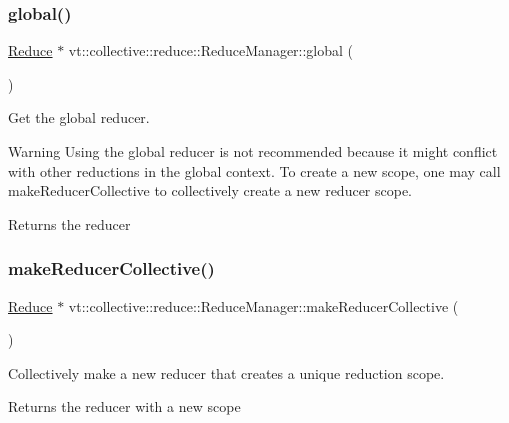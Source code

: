 \subsubsection{\texorpdfstring{global()}{global()}}
{\footnotesize\ttfamily \hyperlink{structvt_1_1collective_1_1reduce_1_1_reduce}{Reduce} $\ast$ vt\+::collective\+::reduce\+::\+Reduce\+Manager\+::global (\begin{DoxyParamCaption}{ }\end{DoxyParamCaption})}



Get the global reducer. 

\begin{DoxyWarning}{Warning}
Using the global reducer is not recommended because it might conflict with other reductions in the global context. To create a new scope, one may call {\ttfamily make\+Reducer\+Collective} to collectively create a new reducer scope.
\end{DoxyWarning}
\begin{DoxyReturn}{Returns}
the reducer 
\end{DoxyReturn}
\mbox{\label{structvt_1_1collective_1_1reduce_1_1_reduce_manager_a4b81ceab5d9f081f393dd68cece25935}} 
\subsubsection{\texorpdfstring{make\+Reducer\+Collective()}{makeReducerCollective()}}
{\footnotesize\ttfamily \hyperlink{structvt_1_1collective_1_1reduce_1_1_reduce}{Reduce} $\ast$ vt\+::collective\+::reduce\+::\+Reduce\+Manager\+::make\+Reducer\+Collective (\begin{DoxyParamCaption}{ }\end{DoxyParamCaption})}



Collectively make a new reducer that creates a unique reduction scope. 

\begin{DoxyReturn}{Returns}
the reducer with a new scope 
\end{DoxyReturn}
\mbox{\label{structvt_1_1collective_1_1reduce_1_1_reduce_manager_a44fa84680d3b310f4cb3f6c776a31751}} 
